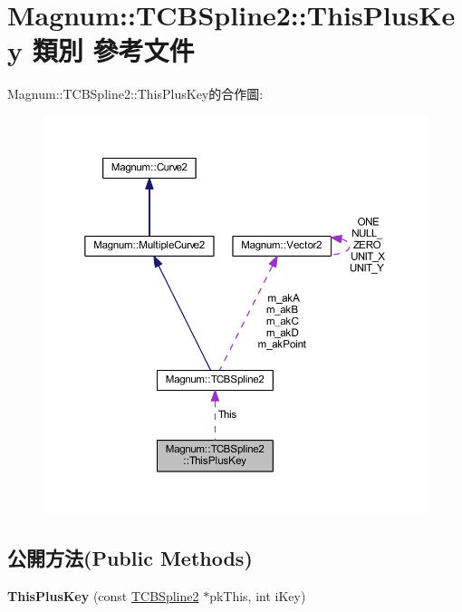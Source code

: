 \hypertarget{class_magnum_1_1_t_c_b_spline2_1_1_this_plus_key}{}\section{Magnum\+:\+:T\+C\+B\+Spline2\+:\+:This\+Plus\+Key 類別 參考文件}
\label{class_magnum_1_1_t_c_b_spline2_1_1_this_plus_key}


Magnum\+:\+:T\+C\+B\+Spline2\+:\+:This\+Plus\+Key的合作圖\+:\nopagebreak
\begin{figure}[H]
\begin{center}
\leavevmode
\includegraphics[width=350pt]{class_magnum_1_1_t_c_b_spline2_1_1_this_plus_key__coll__graph}
\end{center}
\end{figure}
\subsection*{公開方法(Public Methods)}
\begin{DoxyCompactItemize}
\item 
{\bfseries This\+Plus\+Key} (const \hyperlink{class_magnum_1_1_t_c_b_spline2}{T\+C\+B\+Spline2} $\ast$pk\+This, int i\+Key)\hypertarget{class_magnum_1_1_t_c_b_spline2_1_1_this_plus_key_a47d4d279d7932d0bd4e2584a68cc93ab}{}\label{class_magnum_1_1_t_c_b_spline2_1_1_this_plus_key_a47d4d279d7932d0bd4e2584a68cc93ab}

\end{DoxyCompactItemize}
